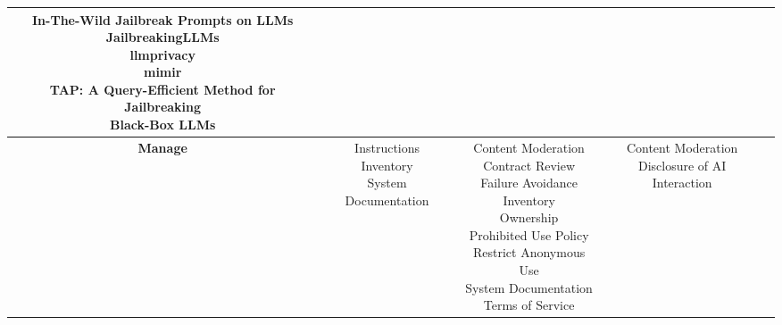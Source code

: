 \documentclass[fleqn]{article}
\begin{document}
\begin{landscape}
\begin{table}[H]
\begin{tabular}{|c|c|c|c|c|}
{			\textbullet\hspace{3pt} In-The-Wild Jailbreak Prompts on LLMs \\ 
			\textbullet\hspace{3pt} JailbreakingLLMs \\ 
			\textbullet\hspace{3pt} llmprivacy \\ 
			\textbullet\hspace{3pt} mimir \\ 
			\textbullet\hspace{3pt} TAP: A Query-Efficient Method for Jailbreaking \\\hspace{10pt}Black-Box LLMs \\ 
		}			
		\\
		\hline		
		\textbf{Manage} &
		\makecell[l]{
			\textbullet\hspace{3pt} Instructions\\ 	
			\textbullet\hspace{3pt} Inventory\\ 
			\textbullet\hspace{3pt} System Documentation\\ 	
		}
		& 
		\makecell[l]{
			\textbullet\hspace{3pt} Content Moderation\\ 	
			\textbullet\hspace{3pt} Contract Review\\ 	
			\textbullet\hspace{3pt} Failure Avoidance\\ 	
			\textbullet\hspace{3pt} Inventory\\ 	
			\textbullet\hspace{3pt} Ownership\\ 	
			\textbullet\hspace{3pt} Prohibited Use Policy\\ 
			\textbullet\hspace{3pt} Restrict Anonymous Use\\ 					
			\textbullet\hspace{3pt} System Documentation\\ 	
			\textbullet\hspace{3pt} Terms of Service\\ 	
		}
		&
		\makecell[l]{ 	
			\textbullet\hspace{3pt} Content Moderation\\ 	
			\textbullet\hspace{3pt} Disclosure of AI Interaction\\ 	
}
\end{tabular}
\end{table}
\end{landscape}
\end{document}
